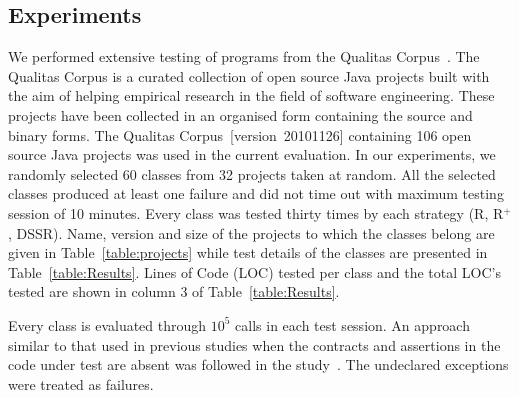 \subsection{Experiments}
We performed extensive testing of programs from the Qualitas Corpus~\cite{tempero2010qualitas}. The Qualitas Corpus is a curated collection of open source Java projects built with the aim of helping empirical research in the field of software engineering. These projects have been collected in an organised form containing the source and binary forms. The Qualitas Corpus~[version~20101126] containing 106 open source Java projects was used in the current evaluation. In our experiments, we randomly selected 60 classes from 32 projects taken at random. All the selected classes produced at least one failure and did not time out with maximum testing session of 10 minutes. Every class was tested thirty times by each strategy (R, R$^+$, DSSR). Name, version and size of the projects to which the classes belong are given in Table~\ref{table:projects} while test details of the classes are presented in Table~\ref{table:Results}. Lines of Code (LOC) tested per class and the total LOC's tested are shown in column 3 of Table~\ref{table:Results}. 

Every class is evaluated through $10^5$ calls in each test session. %
An approach similar to that used in previous studies when the contracts and assertions in the code under test are absent was followed in the study~\cite{csallner2004jcrasher, oriol2012random, ducasse2011challenges}. The undeclared exceptions were treated as failures.


